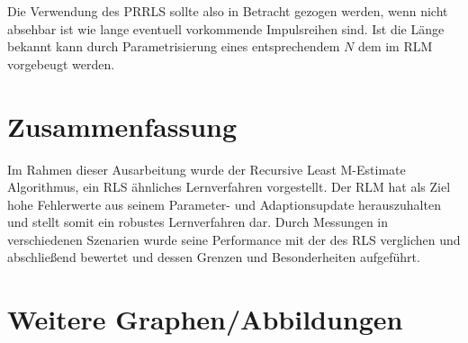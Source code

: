 \documentclass[a4paper, 12pt]{article}
\begin{document}
{Die Verwendung des PRRLS sollte also in Betracht gezogen werden, wenn nicht absehbar ist wie lange eventuell vorkommende Impulsreihen sind. Ist die Länge bekannt kann durch Parametrisierung eines entsprechendem $N$ dem im RLM vorgebeugt werden.

\section{Zusammenfassung}
\label{sec:zusammenfassung}
Im Rahmen dieser Ausarbeitung wurde der Recursive Least M-Estimate Algorithmus, ein RLS ähnliches Lernverfahren vorgestellt. Der RLM hat als Ziel hohe Fehlerwerte aus seinem Parameter- und Adaptionsupdate herauszuhalten und stellt somit ein robustes Lernverfahren dar.
Durch Messungen in verschiedenen Szenarien wurde seine Performance mit der des RLS verglichen und abschließend bewertet und dessen Grenzen und Besonderheiten aufgeführt.
\newpage



\newpage
\appendix
\section{Weitere Graphen/Abbildungen}
}
\end{document}
